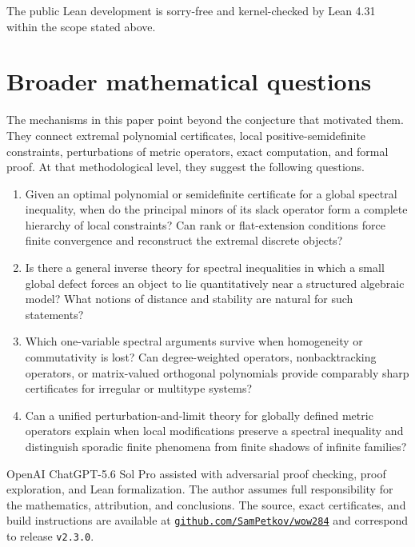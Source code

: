 \documentclass[a4paper,10pt,reqno]{amsart}
\theoremstyle{plain}
\theoremstyle{definition}
\theoremstyle{remark}
\begin{document}
\medskip
\noindent
The public Lean development is sorry-free and kernel-checked by Lean 4.31
within the scope stated above.

\section{Broader mathematical questions}\label{sec:scope}

The mechanisms in this paper point beyond the conjecture that motivated them.
They connect extremal polynomial certificates, local positive-semidefinite
constraints, perturbations of metric operators, exact computation, and formal
proof.  At that methodological level, they suggest the following questions.

\begin{enumerate}
\item Given an optimal polynomial or semidefinite certificate for a global
spectral inequality, when do the principal minors of its slack operator form a
complete hierarchy of local constraints?  Can rank or flat-extension
conditions force finite convergence and reconstruct the extremal discrete
objects?
\item Is there a general inverse theory for spectral inequalities in which a
small global defect forces an object to lie quantitatively near a structured
algebraic model?  What notions of distance and stability are natural for such
statements?
\item Which one-variable spectral arguments survive when homogeneity or
commutativity is lost?  Can degree-weighted operators, nonbacktracking
operators, or matrix-valued orthogonal polynomials provide comparably sharp
certificates for irregular or multitype systems?
\item Can a unified perturbation-and-limit theory for globally defined metric
operators explain when local modifications preserve a spectral inequality
and distinguish sporadic finite phenomena from finite shadows of infinite
families?
\end{enumerate}

OpenAI ChatGPT-5.6 Sol Pro assisted with adversarial proof checking, proof
exploration, and Lean formalization.  The author assumes full responsibility
for the mathematics, attribution, and conclusions.  The source, exact
certificates, and build instructions are available at
\href{https://github.com/SamPetkov/wow284}{\texttt{github.com/SamPetkov/wow284}}
and correspond to release \texttt{v2.3.0}.

\clearpage
\begingroup
\footnotesize
\setlength{\bibsep}{0pt}
\renewcommand{\bibsection}{\section*{References}}


\endgroup
\end{document}
